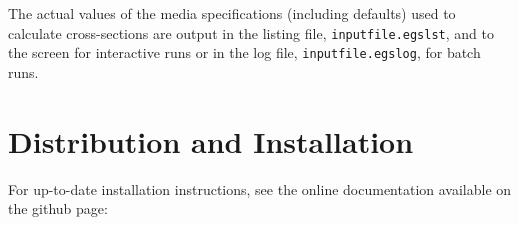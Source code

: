 \documentclass[12pt,twoside]{article}
\begin{document}
The actual values of the media specifications (including defaults) used to calculate cross-sections are
output in the listing file, {\tt inputfile.egslst}, and to the screen for interactive runs or in the
log file, {\tt inputfile.egslog}, for batch runs.

\section{Distribution and Installation}
\renewcommand{\rightmark}{Distribution and Installation}
\label{installbeam}


For up-to-date installation instructions, see the online documentation
available on the github page:
\end{document}
